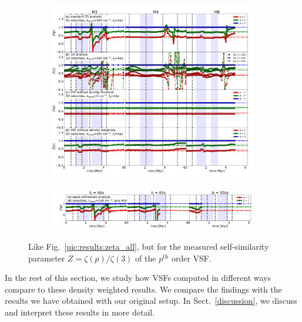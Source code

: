 \begin{figure}[!htb]
	\centering  
  
  \begin{subfigure}[c]{\textwidth}
      \includegraphics[width=\textwidth]{z_all_nojeans.pdf}
      \label{pic:results:z_all_nojeans}
  \end{subfigure}
  
  \begin{subfigure}[c]{\textwidth}
      \addtocounter{subfigure}{4}
      \includegraphics[width=\textwidth]{z_jeans.pdf}
      \label{pic:results:z_all_jeans}
  \end{subfigure}
  
  \caption{Like Fig.~\ref{pic:results:zeta_all}, but for the measured self-similarity parameter $Z = \zeta(p) / \zeta(3)$ of the $p^\mathrm{th}$ order VSF.}
	\label{pic:results:z_all}
\end{figure}

In the rest of this section, we study how VSFs computed in different ways compare to these density weighted results.
We compare the findings with the results we have obtained with our original setup.
In Sect.~\ref{discussion}, we discuss and interpret these results in more detail.


